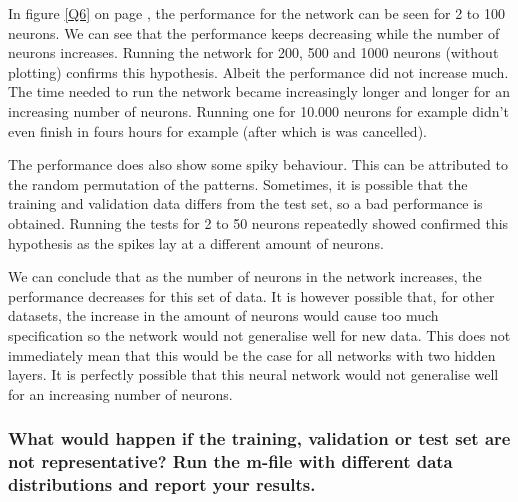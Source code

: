 \documentclass[12pt, a4paper]{article}
\begin{document}
In figure \ref{Q6} on page \pageref{Q6}, the performance for the network can be seen for 2 to 100 neurons. We can see that the performance keeps decreasing while the number of neurons increases. Running the network for 200, 500 and 1000 neurons (without plotting) confirms this hypothesis. Albeit the performance did not increase much. The time needed to run the network became increasingly longer and longer for an increasing number of neurons. Running one for 10.000 neurons for example didn't even finish in fours hours for example (after which is was cancelled).

The performance does also show some spiky behaviour. This can be attributed to the random permutation of the patterns. Sometimes, it is possible that the training and validation data differs from the test set, so a bad performance is obtained. Running the tests for 2 to 50 neurons repeatedly showed confirmed this hypothesis as the spikes lay at a different amount of neurons.

We can conclude that as the number of neurons in the network increases, the performance decreases for this set of data. It is however possible that, for other datasets, the increase in the amount of neurons would cause too much specification so the network would not generalise well for new data. This does not immediately mean that this would be the case for all networks with two hidden layers. It is perfectly possible that this neural network would not generalise well for an increasing number of neurons.

\subsubsection{What would happen if the training, validation or test set are not representative? Run the m-file with different data distributions and report your results.}
\end{document}
